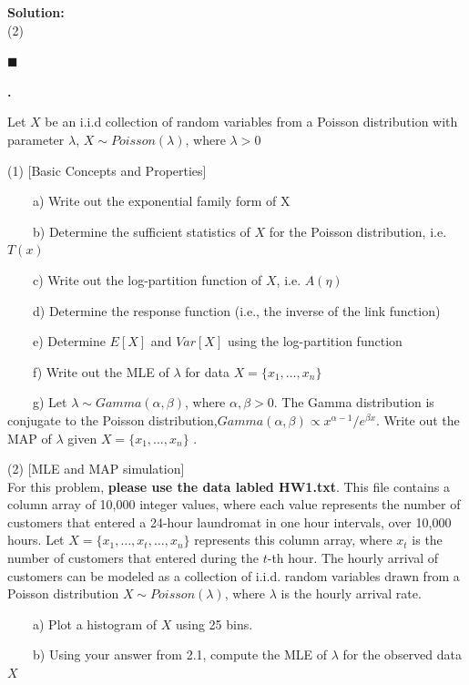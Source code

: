 \documentclass{article}
\newcounter{pcounter}                                   %
\newenvironment{problem}                                %
{                                                       %
    \stepcounter{pcounter}                              %
    \textbf{\arabic{pcounter}.}                         %
}{}                                                     %
\newenvironment{solution}                               %
{\textbf{Solution:} \\}{$\blacksquare$\newline}         %
\newcommand{\tab}{\ \ \ \ }                             %
\begin{document}
\begin{solution}
        (2) 

    \end{solution}

    \begin{problem}
        Let $X$ be an i.i.d collection of random variables from a Poisson distribution with parameter $\lambda$, $X \sim Poisson(\lambda)$, where $\lambda > 0$

        (1) [Basic Concepts and Properties]

        \tab a) Write out the exponential family form of X
        
        \tab b) Determine the sufficient statistics of $X$ for the Poisson distribution, i.e. $T(x)$
        
        \tab c) Write out the log-partition function of $X$, i.e. $A(\eta)$
        
        \tab d) Determine the response function (i.e., the inverse of the link function)
        
        \tab e) Determine $E[X]$ and $Var[X]$ using the log-partition function
        
        \tab f) Write out the MLE of $\lambda$ for data $X=\{x_1, \dots, x_n\}$
        
        \tab g) Let $\lambda \sim Gamma(\alpha, \beta)$, where $\alpha, \beta > 0$. The Gamma distribution is conjugate to the Poisson distribution,$ Gamma(\alpha, \beta) \propto x^{\alpha - 1} / e^{\beta x}$. Write out the MAP of $\lambda$ given $X=\{x_1, \dots, x_n\}$ .

        (2) [MLE and MAP simulation] \\
        For this problem, \textbf{please use the data labled HW1.txt}. This file contains a column array of 10,000 integer values, where each value represents the number of customers that entered a 24-hour laundromat in one hour intervals, over 10,000 hours.
        Let $X = \{x_1, \dots, x_t, \dots, x_n\}$ represents this column array, where $x_t$ is the number of customers that entered during the $t$-th hour. The hourly arrival of customers can be modeled as a collection of i.i.d. random variables drawn from a Poisson distribution $X \sim Poisson(\lambda)$, where $\lambda$ is the hourly arrival rate.
        
        \tab a) Plot a histogram of $X$ using 25 bins.
        
        \tab b) Using your answer from 2.1, compute the MLE of $\lambda$ for the observed data $X$ 


\end{problem}
\end{document}
